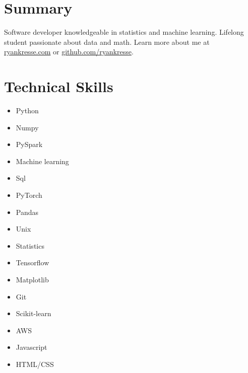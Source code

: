 \documentclass[11pt]{article}
\begin{document}
	
	
	\smallskip
	

	\section{Summary}
		Software developer knowledgeable in statistics and machine learning. Lifelong student passionate about data and math. Learn more about me at \href{http://ryankresse.com/blog}{ryankresse.com} or \href{https://github.com/ryankresse}{github.com/ryankresse}.	
	\section{Technical Skills}
		\begin{multicols}{4}
			\begin{itemize}
				\item Python 				
				\item Numpy				 
				\item PySpark
				\item Machine learning
				
				\columnbreak
				\item Sql 
				\item PyTorch
				\item Pandas 
				\item Unix 
				
				\columnbreak
				\item Statistics
				\item Tensorflow 
				\item Matplotlib			
				\item Git
				
							
				
				\columnbreak 
				\item Scikit-learn							
				
				\item AWS
				\item Javascript 
				\item HTML/CSS 
				
				 				
				\columnbreak 
				
			\end{itemize}
		\end{multicols}
	
\end{document}
